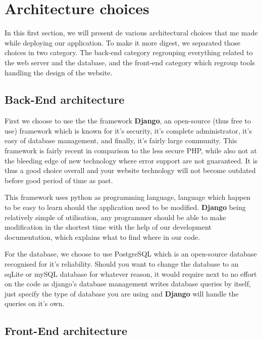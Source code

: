 \section{Architecture choices}
\label{sec:Architecture choices}


In this first section, we will present de various architectural choices that me made while deploying our application. To make it more digest, we separated those choices in two category. The back-end category regrouping everything related to the web server and the database, and the front-end category which regroup tools handling the design of the website.

\subsection{Back-End architecture}

First we choose to use the the framework \textbf{Django}, an open-source (thus free to use)
framework which is known for it's security, it's complete administrator, it's easy of
database management, and finally, it's fairly large community. This framework is fairly
recent in comparison to the less secure PHP, while also not at the bleeding edge of new technology where error support are not guaranteed. It is thus a good choice overall and your
website technology will not become outdated before good period of time as past.\newline

This framework uses python as programming language, language which happen to be easy to
learn should the application need to be modified. \textbf{Django} being relatively simple of
utilisation, any programmer should be able to make modification in the shortest time with
the help of our development documentation, which explains what to find where in our code.\newline

For the database, we choose to use PostgreSQL which is an open-source database recognised
for it's reliability. Should you want to change the database to an sqLite or mySQL database
for whatever reason, it would require next to no effort on the code as django's database
management writes database queries by itself, just specify the type of database you are
using and \textbf{Django} will handle the queries on it's own.\newline

\subsection{Front-End architecture}

